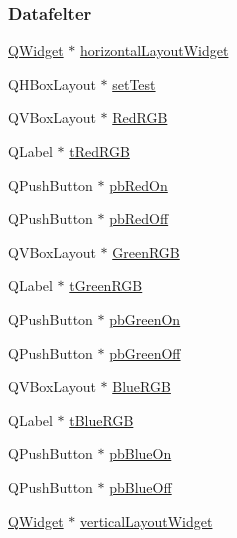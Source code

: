 \subsubsection*{Datafelter}
\begin{DoxyCompactItemize}
\item 
\hyperlink{class_q_widget}{Q\+Widget} $\ast$ \hyperlink{class_ui___spi_test_program_a8d9662f61dc85ce78495602f1d03006f}{horizontal\+Layout\+Widget}
\item 
Q\+H\+Box\+Layout $\ast$ \hyperlink{class_ui___spi_test_program_ab40f35f9bcce17af63ba573e1e8ee485}{set\+Test}
\item 
Q\+V\+Box\+Layout $\ast$ \hyperlink{class_ui___spi_test_program_a266d140f4ccd88877aee1b242908b21d}{Red\+R\+GB}
\item 
Q\+Label $\ast$ \hyperlink{class_ui___spi_test_program_a44f9277d36451995887541d6e333c772}{t\+Red\+R\+GB}
\item 
Q\+Push\+Button $\ast$ \hyperlink{class_ui___spi_test_program_a58972344360380ab7a3cedec6de9fb0d}{pb\+Red\+On}
\item 
Q\+Push\+Button $\ast$ \hyperlink{class_ui___spi_test_program_ad6661caed9d7154252ff188ea62e538c}{pb\+Red\+Off}
\item 
Q\+V\+Box\+Layout $\ast$ \hyperlink{class_ui___spi_test_program_a45540b28778c355f4e372566eb065ef3}{Green\+R\+GB}
\item 
Q\+Label $\ast$ \hyperlink{class_ui___spi_test_program_a56e39ae0021a6fba651282c09e6d38da}{t\+Green\+R\+GB}
\item 
Q\+Push\+Button $\ast$ \hyperlink{class_ui___spi_test_program_aa00d405e11fadc9dd8d0b7aae2632903}{pb\+Green\+On}
\item 
Q\+Push\+Button $\ast$ \hyperlink{class_ui___spi_test_program_ad4aa6f2ff845832ee96f6158c85bbfba}{pb\+Green\+Off}
\item 
Q\+V\+Box\+Layout $\ast$ \hyperlink{class_ui___spi_test_program_ac0ff6df3d4236129efdc0762eed715f4}{Blue\+R\+GB}
\item 
Q\+Label $\ast$ \hyperlink{class_ui___spi_test_program_a24f37f517fcdcba9802de32d4cb7cd2a}{t\+Blue\+R\+GB}
\item 
Q\+Push\+Button $\ast$ \hyperlink{class_ui___spi_test_program_a3f13697eb9ebac3370cf5b1456bb2ab6}{pb\+Blue\+On}
\item 
Q\+Push\+Button $\ast$ \hyperlink{class_ui___spi_test_program_add50c8a20a19c966af33418b767fb815}{pb\+Blue\+Off}
\item 
\hyperlink{class_q_widget}{Q\+Widget} $\ast$ \hyperlink{class_ui___spi_test_program_a4dab2ee47678bbea22fe10267a009293}{vertical\+Layout\+Widget}

\end{DoxyCompactItemize}
